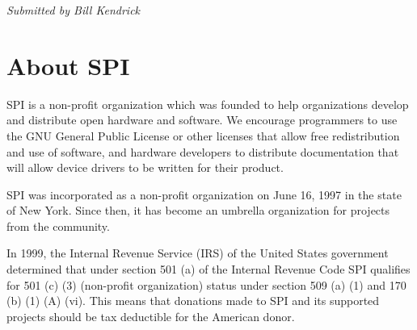 \documentclass[a4paper]{report}
\begin{document}
{\em Submitted by Bill Kendrick}


\appendix
\chapter{About SPI}

SPI is a non-profit organization which was founded to help organizations
develop and distribute open hardware and software. We encourage programmers
to use the GNU General Public License or other licenses that allow free
redistribution and use of software, and hardware developers to distribute
documentation that will allow device drivers to be written for their product.

SPI was incorporated as a non-profit organization on June 16, 1997 in the state
of New York. Since then, it has become an umbrella organization for projects
from the community.

In 1999, the Internal Revenue Service (IRS) of the United States government
determined that under section 501 (a) of the Internal Revenue Code SPI
qualifies for 501 (c) (3) (non-profit organization) status under section 509
(a) (1) and 170 (b) (1) (A) (vi). This means that donations made to SPI and its
supported projects should be tax deductible for the American donor.

\newpage

\pagestyle{empty}


\null
\end{document}
